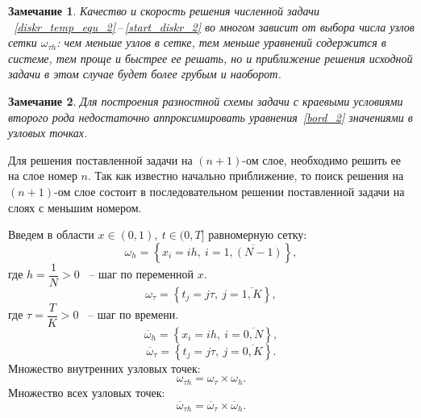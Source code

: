\documentclass[11pt,a4paper,twoside]{report}
\numberwithin{equation}{section}
\theoremstyle{definition}
\theoremstyle{plain}
\newtheorem{note}{Замечание}[section]
\begin{document}
%
%
\begin{note}
%
    Качество и скорость решения численной задачи
   ~\eqref{diskr_temp_equ_2}\,--\,\eqref{start_diskr_2}
    во многом зависит от выбора числа узлов сетки $\omega_{\tau h}$:
    чем меньше узлов в сетке, тем меньше уравнений содержится в системе,
    тем проще и быстрее ее решать, но и приближение решения исходной задачи
    в этом случае будет более грубым и наоборот.
%
\end{note}
%





\begin{note}
%
    Для построения разностной схемы задачи с краевыми условиями второго рода
    недостаточно аппроксимировать уравнения~\eqref{bord_2} значениями в узловых
    точках.
%
\end{note}
%
%

Для решения поставленной задачи на $(n+1)$-ом слое, необходимо решить ее
на слое номер $n$. Так как известно начально приближение, то поиск решения на
$(n+1)$-ом слое состоит в последовательном решении поставленной задачи на слоях
с меньшим номером.

\fi



%
Введем в области $x \in (0,1),~t\in (0,T]$ равномерную сетку:
%
$$
    \omega_h = \left\{x_i = ih, ~i = \overline{1, (N - 1)}\right\},
$$
%
где $ h = \dfrac1N > 0$ ~-- шаг по переменной $x$.
%
$$
    \omega_{\tau} = \left\{t_j = j\tau , ~j = \overline{1, K}\right\},
$$
%
где $\tau = \dfrac{T}{K} > 0$ ~-- шаг по времени.
%
$$
    \overline{\omega}_h = \left\{x_i = ih,~i = \overline{0, N}\right\},
$$
%
$$
    \overline{\omega}_{\tau} = \left\{t_j = j\tau ,~j = \overline{0,K}\right\}.
$$
%
Множество внутренних узловых точек:
%
$$
    \omega_{\tau h} = \omega_\tau \times \omega_h.
$$
%
Множество всех узловых точек:
%
$$
    \overline{\omega}_{\tau h} = \overline{\omega}_\tau \times
    \overline{\omega}_h.
$$
%
\end{document}
